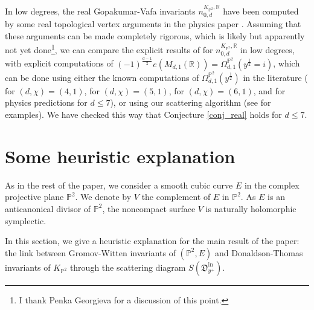 \documentclass[11pt,letterpaper]{amsart}
\newcommand\PP{\mathbb P}
\newcommand\R{\mathbb R}
\newcommand\fD{\mathfrak D}
\newcommand\iin{\mathrm{in}}
\begin{document}
In low degrees, the real Gopakumar-Vafa invariants $n_{0,d}^{K_{\PP^2},\R}$ 
have been computed by some real topological vertex arguments in the physics paper \cite{krefl2009real}. 
Assuming that these arguments can be made completely rigorous, which is likely but apparently not yet done\footnote{I thank Penka Georgieva for a discussion of this point.}, we can compare the explicit results of 
\cite[Table 2, p33]{krefl2009real} for $n_{0,d}^{K_{\PP^2},\R}$ in low degrees, with
explicit computations of
$(-1)^{\frac{d-1}{2}} e(M_{d,1}(\R))=\Omega_{d,1}^{\PP^2}(y^{\frac{1}{2}}=i)$, which can be done using either the known computations of 
$\Omega_{d,1}^{\PP^2}(y^{\frac{1}{2}})$ 
in the literature
(\cite{MR3217411} for
$(d,\chi)=(4,1)$,
\cite{MR3488141, MR3324766,
MR3152206} for $(d,\chi)=(5,1)$,
\cite{MR3319919} for $(d,\chi)=(6,1)$, and \cite[Table 2]{MR3035638} for physics predictions for $d \leqslant 7$), or using our scattering algorithm (see \cite[\S 6.4]{bousseau2019scattering} for examples). We have checked this way that Conjecture \ref{conj_real} holds for $d \leqslant 7$.


\section{Some heuristic explanation}
\label{section_heuristic_explanation}

As in the rest of the paper, we consider a smooth cubic curve $E$
in the complex projective plane
$\PP^2$.
We denote by $V$ the complement of $E$
in $\PP^2$. As $E$ is an anticanonical divisor of $\PP^2$, the noncompact surface $V$ is naturally
holomorphic symplectic.

In this section, we give a heuristic explanation for the main result of the paper: the link between Gromov-Witten invariants of $(\PP^2,E)$ and Donaldson-Thomas invariants of $K_{\PP^2}$ through the scattering diagram $S(\fD^{\iin}_{y^+})$.
\end{document}

